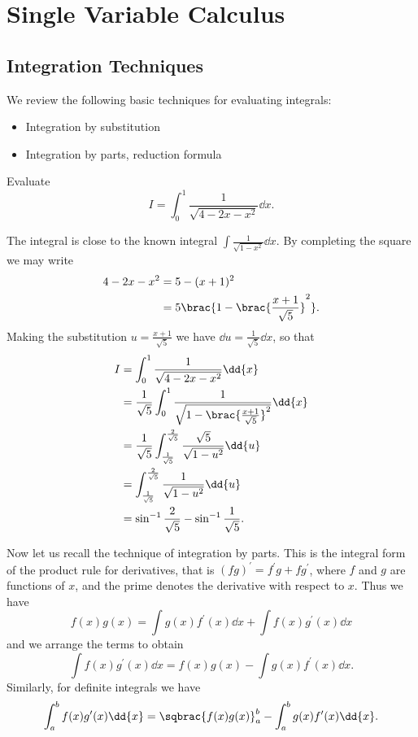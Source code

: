 \chapter{Single Variable Calculus}
\section{Integration Techniques}
We review the following basic techniques for evaluating integrals:
\begin{itemize}
\item Integration by substitution
\item Integration by parts, reduction formula
\end{itemize}

\begin{exercise}
Evaluate
\[I=\int_{0}^{1}\frac{1}{\sqrt{4-2x-x^2}}\dd{x}.\]
\end{exercise}

\begin{solution}
The integral is close to the known integral $\int\frac{1}{\sqrt{1-x^2}}\dd{x}$. By completing the square we may write
\begin{align*}
4-2x-x^2&=5-(x+1)^2\\
&=5\brac{1-\brac{\frac{x+1}{\sqrt{5}}}^2}.
\end{align*}
Making the substitution $u=\frac{x+1}{\sqrt{5}}$ we have $\dd{u}=\frac{1}{\sqrt{5}}\dd{x}$, so that
\begin{align*}
I&=\int_{0}^{1}\frac{1}{\sqrt{4-2x-x^2}}\dd{x}\\
&=\frac{1}{\sqrt{5}}\int_{0}^{1}\frac{1}{\sqrt{1-\brac{\frac{x+1}{\sqrt{5}}}^2}}\dd{x}\\
&=\frac{1}{\sqrt{5}}\int_{\frac{1}{\sqrt{5}}}^{\frac{2}{\sqrt{5}}}\frac{\sqrt{5}}{\sqrt{1-u^2}}\dd{u}\\
&=\int_{\frac{1}{\sqrt{5}}}^{\frac{2}{\sqrt{5}}}\frac{1}{\sqrt{1-u^2}}\dd{u}\\
&=\sin^{-1}\frac{2}{\sqrt{5}}-\sin^{-1}\frac{1}{\sqrt{5}}.
\end{align*}
\end{solution}

Now let us recall the technique of integration by parts. This is the integral form of the product rule for derivatives, that is $(fg)^\prime=f^\prime g+fg^\prime$, where $f$ and $g$ are functions of $x$, and the prime denotes the derivative with respect to $x$. Thus we have
\[f(x)g(x)=\int g(x)f^\prime(x)\dd{x}+\int f(x)g^\prime(x)\dd{x}\]
and we arrange the terms to obtain
\[\int f(x)g^\prime(x)\dd{x}=f(x)g(x)-\int g(x)f^\prime(x)\dd{x}.\]
Similarly, for definite integrals we have
\[\int_{a}^{b}f(x)g^\prime(x)\dd{x}=\sqbrac{f(x)g(x)}_a^b-\int_{a}^{b}g(x)f^\prime(x)\dd{x}.\]

